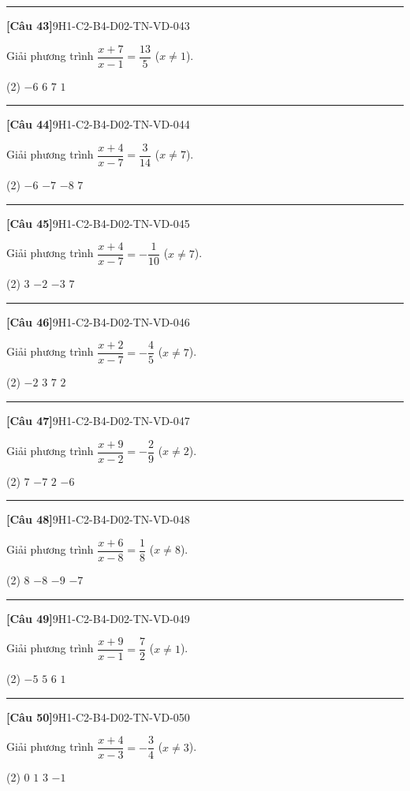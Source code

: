 \documentclass[12pt,a4paper]{article}
\newif\ifloigiai
\newenvironment{cauhoi}[2]{%
  \par\medskip\noindent\rule{\textwidth}{0.4pt}\par\nopagebreak
  \noindent\textbf{[#1]}\hfill{\scriptsize\ttfamily #2}\par\nopagebreak\smallskip}{\par}
\newcommand{\dapan}[1]{\ifloigiai\par\smallskip\noindent\textit{Đáp án:} \textbf{#1}\par\fi}
\begin{document}
\begin{cauhoi}{Câu 43}{9H1-C2-B4-D02-TN-VD-043}
Giải phương trình $\dfrac{x+7}{x-1}=\dfrac{13}{5}$ ($x\ne 1$).
\begin{tasks}(2)
\task $-6$
\task $6$
\task $7$
\task $1$
\end{tasks}
\dapan{B}
\end{cauhoi}
\begin{cauhoi}{Câu 44}{9H1-C2-B4-D02-TN-VD-044}
Giải phương trình $\dfrac{x+4}{x-7}=\dfrac{3}{14}$ ($x\ne 7$).
\begin{tasks}(2)
\task $-6$
\task $-7$
\task $-8$
\task $7$
\end{tasks}
\dapan{B}
\end{cauhoi}
\begin{cauhoi}{Câu 45}{9H1-C2-B4-D02-TN-VD-045}
Giải phương trình $\dfrac{x+4}{x-7}=-\dfrac{1}{10}$ ($x\ne 7$).
\begin{tasks}(2)
\task $3$
\task $-2$
\task $-3$
\task $7$
\end{tasks}
\dapan{C}
\end{cauhoi}
\begin{cauhoi}{Câu 46}{9H1-C2-B4-D02-TN-VD-046}
Giải phương trình $\dfrac{x+2}{x-7}=-\dfrac{4}{5}$ ($x\ne 7$).
\begin{tasks}(2)
\task $-2$
\task $3$
\task $7$
\task $2$
\end{tasks}
\dapan{D}
\end{cauhoi}
\begin{cauhoi}{Câu 47}{9H1-C2-B4-D02-TN-VD-047}
Giải phương trình $\dfrac{x+9}{x-2}=-\dfrac{2}{9}$ ($x\ne 2$).
\begin{tasks}(2)
\task $7$
\task $-7$
\task $2$
\task $-6$
\end{tasks}
\dapan{B}
\end{cauhoi}
\begin{cauhoi}{Câu 48}{9H1-C2-B4-D02-TN-VD-048}
Giải phương trình $\dfrac{x+6}{x-8}=\dfrac{1}{8}$ ($x\ne 8$).
\begin{tasks}(2)
\task $8$
\task $-8$
\task $-9$
\task $-7$
\end{tasks}
\dapan{B}
\end{cauhoi}
\begin{cauhoi}{Câu 49}{9H1-C2-B4-D02-TN-VD-049}
Giải phương trình $\dfrac{x+9}{x-1}=\dfrac{7}{2}$ ($x\ne 1$).
\begin{tasks}(2)
\task $-5$
\task $5$
\task $6$
\task $1$
\end{tasks}
\dapan{B}
\end{cauhoi}
\begin{cauhoi}{Câu 50}{9H1-C2-B4-D02-TN-VD-050}
Giải phương trình $\dfrac{x+4}{x-3}=-\dfrac{3}{4}$ ($x\ne 3$).
\begin{tasks}(2)
\task $0$
\task $1$
\task $3$
\task $-1$
\end{tasks}
\dapan{D}
\end{cauhoi}
\end{document}
